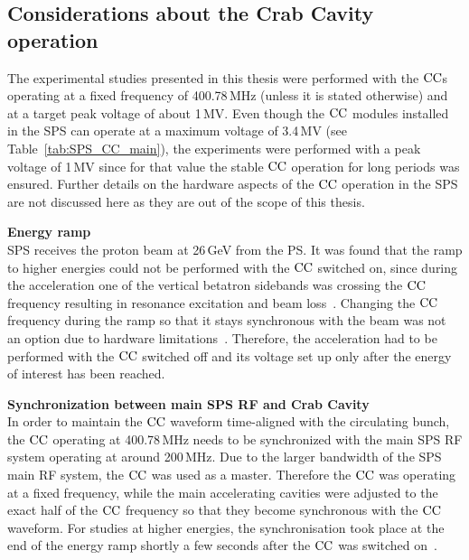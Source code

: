  
\subsection{Considerations about the Crab Cavity operation}\label{sec:cc_setup}
The experimental studies presented in this thesis were performed with the ${\mathrm{CC}}$s operating at a fixed frequency of 400.78\,MHz (unless it is stated otherwise) and at a target peak voltage of about 1\,MV. %
Even though the ${\mathrm{CC}}$ modules installed in the SPS can operate at a maximum voltage of 3.4\,MV (see Table~\ref{tab:SPS_CC_main}), the experiments were performed with a peak voltage of 1\,MV since for that value the stable ${\mathrm{CC}}$ operation for long periods was ensured. Further details on the hardware aspects of the ${\mathrm{CC}}$ operation in the SPS are not discussed here as they are out of the scope of this thesis.

\textbf{Energy ramp}\\
SPS receives the proton beam at 26\,GeV from the PS. It was found that the ramp to higher energies could not be performed with the ${\mathrm{CC}}$ switched on, since during the acceleration one of the vertical betatron sidebands was crossing the ${\mathrm{CC}}$ frequency resulting in resonance excitation and beam loss~\cite{BE_seminar, CC_rephasing_RF}. Changing the ${\mathrm{CC}}$ frequency during the ramp so that it stays synchronous with the beam was not an option due to hardware limitations~\cite{CC_rephasing_RF}. %
Therefore, the acceleration had to be performed with the ${\mathrm{CC}}$ switched off and its voltage set up only after the energy of interest has been reached. %

\textbf{Synchronization between main SPS RF and Crab Cavity}\\
In order to maintain the ${\mathrm{CC}}$ waveform time-aligned with the circulating bunch, the ${\mathrm{CC}}$ operating at 400.78\,MHz needs to be synchronized with the main SPS RF system operating at around 200\,MHz. Due to the larger bandwidth of the SPS main RF system, the ${\mathrm{CC}}$ was used as a master. Therefore the ${\mathrm{CC}}$ was operating at a fixed frequency, while the main accelerating cavities were adjusted to the exact half of the ${\mathrm{CC}}$ frequency so that they become synchronous with the ${\mathrm{CC}}$ waveform. For studies at higher energies, the synchronisation took place at the end of the energy ramp shortly a few seconds after the ${\mathrm{CC}}$ was switched on~\cite{BE_seminar}. %

